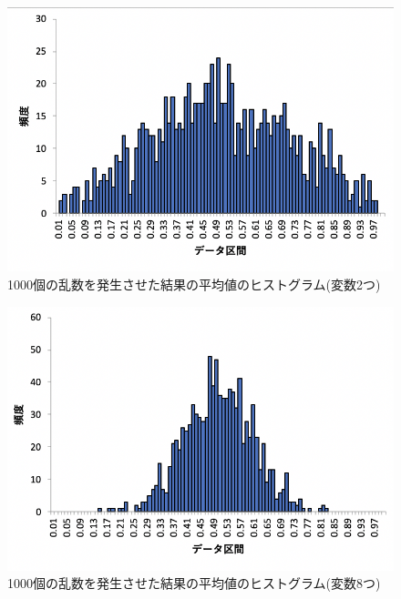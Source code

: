 \documentclass[12pt]{jarticle}
\begin{document}
\begin{figure}[h]
    \begin{center}
        \includegraphics[scale=0.8]{kadai4_2graph3.png}
    \end{center}
    \caption{1000個の乱数を発生させた結果の平均値のヒストグラム(変数2つ)}
\end{figure}
\begin{figure}[h]
    \begin{center}
        \includegraphics[scale=0.8]{kadai4_2graph4.png}
    \end{center}
    \caption{1000個の乱数を発生させた結果の平均値のヒストグラム(変数8つ)}
\end{figure}
\end{document}
